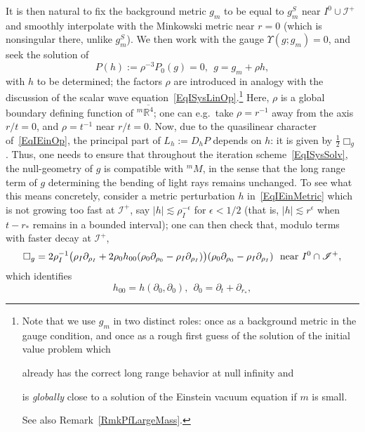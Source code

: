 \documentclass[reqno,11pt,letterpaper]{amsart}
\numberwithin{equation}{section}
\numberwithin{figure}{section}
\theoremstyle{definition}
\theoremstyle{remark}
\newcommand{\ms}{\mathscr}
\newcommand{\scri}{\ms I}
\newcommand{\R}{\mathbb{R}}
\newcommand{\Ups}{\Upsilon}
\newcommand{\eps}{\epsilon}
\newcommand{\ol}{\overline}
\newcommand{\pa}{\partial}
\newcommand{\tn}{\textnormal}
\newcommand{\half}{\tfrac{1}{2}}
\begin{document}
It is then natural to fix the background metric $g_m$ to be equal to $g_m^S$ near $I^0\cup\scri^+$ and smoothly interpolate with the Minkowski metric near $r=0$ (which is nonsingular there, unlike $g_m^S$). We then work with the gauge $\Ups(g;g_m)=0$, and seek the solution of
\begin{equation}
\label{EqIEinMetric}
  P(h) := \rho^{-3} P_0(g) = 0,\ \ g = g_m + \rho h,
\end{equation}
with $h$ to be determined; the factors $\rho$ are introduced in analogy with the discussion of the scalar wave equation~\eqref{EqISysLinOp}.\footnote{Note that we use $g_m$ in two distinct roles: once as a background metric in the gauge condition, and once as a rough first guess of the solution of the initial value problem which \begin{enumerate*} \item already has the correct long range behavior at null infinity and \item is \emph{globally} close to a solution of the Einstein vacuum equation if $m$ is small. \end{enumerate*} See also Remark~\ref{RmkPfLargeMass}.} Here, $\rho$ is a global boundary defining function of ${}^m\ol{\R^4}$; one can e.g.\ take $\rho=r^{-1}$ away from the axis $r/t=0$, and $\rho=t^{-1}$ near $r/t=0$. Now, due to the quasilinear character of~\eqref{EqIEinOp}, the principal part of $L_h:=D_h P$ depends on $h$: it is given by $\half\Box_g$. Thus, one needs to ensure that throughout the iteration scheme~\eqref{EqISysSolv}, the null-geometry of $g$ is compatible with ${}^m\!M$, in the sense that the long range term of $g$ determining the bending of light rays remains unchanged. To see what this means concretely, consider a metric perturbation $h$ in~\eqref{EqIEinMetric} which is not growing too fast at $\scri^+$, say $|h|\lesssim \rho_I^{-\eps}$ for $\eps<1/2$ (that is, $|h|\lesssim r^\eps$ when $t-r_*$ remains in a bounded interval); one can then check that, modulo terms with faster decay at $\scri^+$,
\begin{equation}
\label{EqIEinLongRange}
  \Box_g = 2\rho_I^{-1}\bigl(\rho_I\pa_{\rho_I}+2\rho_0 h_{0 0}(\rho_0\pa_{\rho_0}-\rho_I\pa_{\rho_I})\bigr)(\rho_0\pa_{\rho_0}-\rho_I\pa_{\rho_I})\ \ \tn{near}\ I^0\cap\scri^+,
\end{equation}
which identifies
\begin{equation}
\label{EqIEinGood}
  h_{0 0}=h(\pa_0,\pa_0),\ \ \pa_0=\pa_t+\pa_{r_*},
\end{equation}
\end{document}
